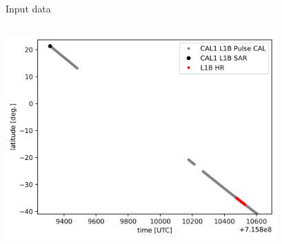 \documentclass[compress,8pt]{beamer}
\begin{document}
\begin{frame}{Input data}
\begin{columns}
\begin{column}{0.45\textwidth}
\medskip
$\!\!\!\!\!$\includegraphics[width=0.78\textwidth]{fig/test_track_loc}
\end{column}
\end{columns}


\end{frame}
\end{document}
